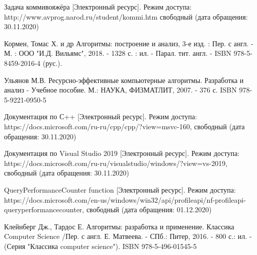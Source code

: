 \documentclass[12pt]{report}
\begin{document}
	\begin{thebibliography}{2}
		
		 Задача коммивояжёра [Электронный ресурс]. Режим доступа: http://www.avprog.narod.ru/student/kommi.htm свободный (дата обращения: 30.11.2020)
		
		 Кормен, Томас Х. и др Алгоритмы: построение и анализ, 3-е изд. : Пер. с англ. - М. : ООО "И.Д. Вильямс", 2018. - 1328 с. : ил. - Парал. тит. англ. -  ISBN 978-5-8459-2016-4 (рус.).
		
		 Ульянов М.В. Ресурсно-эффективные компьютерные алгоритмы. Разработка и анализ - Учебное пособие. М.: НАУКА, ФИЗМАТЛИТ, 2007. - 376 с. ISBN 978-5-9221-0950-5
		
		 Документация по С++  [Электронный ресурс]. Режим доступа: https://docs.microsoft.com/ru-ru/cpp/cpp/?view=msvc-160, свободный (дата обращения: 30.11.2020)
		
		 Документация по Visual Studio 2019 [Электронный ресурс]. Режим доступа: https://docs.microsoft.com/ru-ru/visualstudio/windows/?view=vs-2019, свободный (дата обращения: 30.11.2020)
		
		 QueryPerformanceCounter function [Электронный ресурс]. Режим доступа: https://docs.microsoft.com/en-us/windows/win32/api/profileapi/nf-profileapi-queryperformancecounter, свободный (дата обращения: 01.12.2020)
		
		
		
		 Клейнберг Дж., Тардос Е. Алгоритмы: разработка и применение. Классика Computer Science /Пер. с англ. Е. Матвеева. - СПб.: Питер, 2016. - 800 с.: ил. - (Серия "Классика computer science"). ISBN 978-5-496-01545-5
		
		
	\end{thebibliography}
\end{document}
